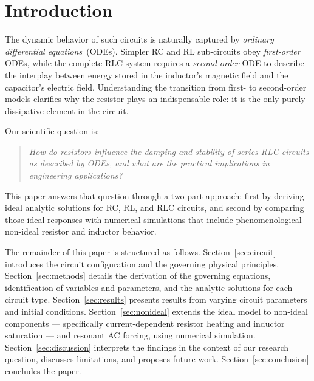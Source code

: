 \section{Introduction}
\label{sec:intro}

The dynamic behavior of such circuits is naturally captured by
\emph{ordinary differential equations}~(ODEs).
Simpler RC and RL sub-circuits obey \emph{first-order} ODEs, while the
complete RLC system requires a \emph{second-order} ODE to describe the
interplay between energy stored in the inductor's magnetic field and the
capacitor's electric field.
Understanding the transition from first- to second-order models clarifies
why the resistor plays an indispensable role: it is the only purely
dissipative element in the circuit.

Our scientific question is:
\begin{quote}
  \itshape
  How do resistors influence the damping and stability of series RLC circuits
  as described by ODEs, and what are the practical implications in engineering
  applications?
\end{quote}

This paper answers that question through a two-part approach: first by
deriving ideal analytic solutions for RC, RL, and RLC circuits, and second by
comparing those ideal responses with numerical simulations that include
phenomenological non-ideal resistor and inductor behavior.

The remainder of this paper is structured as follows.
Section~\ref{sec:circuit} introduces the circuit configuration and the
governing physical principles.
Section~\ref{sec:methods} details the derivation of the governing equations,
identification of variables and parameters, and the analytic solutions for
each circuit type.
Section~\ref{sec:results} presents results from varying circuit parameters
and initial conditions.
Section~\ref{sec:nonideal} extends the ideal model to non-ideal components
--- specifically current-dependent resistor heating and inductor saturation
--- and resonant AC forcing, using numerical simulation.
Section~\ref{sec:discussion} interprets the findings in the context of our
research question, discusses limitations, and proposes future work.
Section~\ref{sec:conclusion} concludes the paper.
